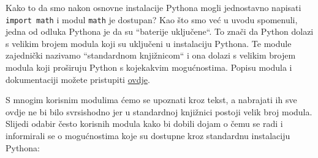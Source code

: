 Kako to da smo nakon osnovne instalacije Pythona mogli jednostavno napisati \texttt{import math} i modul \texttt{math} je dostupan? Kao što smo već u uvodu spomenuli, jedna od odluka Pythona je da su \textquotedblleft baterije uključene\textquotedblleft{}. To znači da Python dolazi s velikim brojem modula koji su uključeni u instalaciju Pythona. Te module zajednički nazivamo \textquotedblleft standardnom knjižnicom\textquotedblleft{} i ona dolazi s velikim brojem modula koji proširuju Python s kojekakvim mogućnostima. Popisu modula i dokumentaciji možete pristupiti \href{https://docs.python.org/3/library/index.html}{ovdje}.

S mnogim korisnim modulima ćemo se upoznati kroz tekst, a nabrajati ih sve ovdje ne bi bilo svrsishodno jer u standardnoj knjižnici postoji velik broj modula. Slijedi odabir često korisnih modula kako bi dobili dojam o čemu se radi i informirali se o mogućnostima koje su dostupne kroz standardnu instalaciju Pythona:

